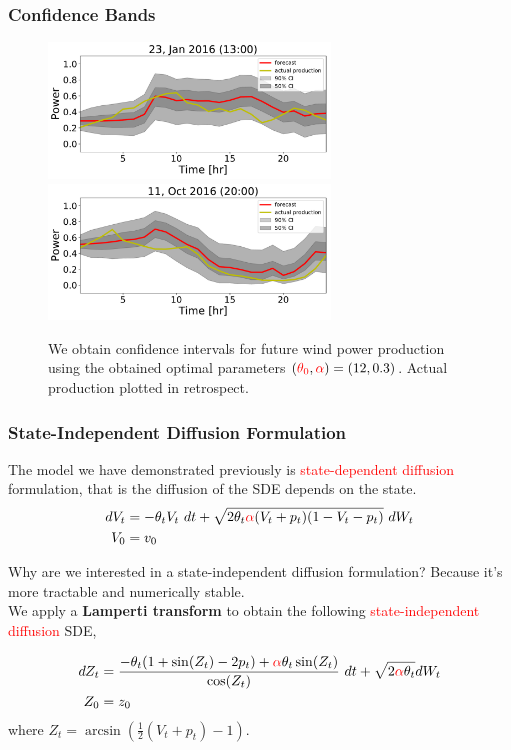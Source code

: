 \documentclass[aspectratio=169]{beamer}\usepackage[utf8]{inputenc}
\begin{document}
\begin{frame}\frametitle{Confidence Bands}
    \begin{figure}
      \includegraphics[width=75mm,scale=1]{confidence_intervals/24hr/31.pdf}
      \includegraphics[width=75mm,scale=1]{confidence_intervals/24hr/820.pdf}
       \caption{We obtain confidence intervals for future wind power production using the obtained optimal parameters $(\textcolor{red}{\theta_0}, \textcolor{red}{\alpha} )=(12,0.3)$. Actual production plotted in retrospect. }
    \end{figure}
\end{frame}

\begin{frame}\frametitle{State-Independent Diffusion Formulation}
The model we have demonstrated previously is \textcolor{red}{state-dependent diffusion} formulation, that is the diffusion of the SDE depends on the state.
\begin{equation}
\begin{split}
dV_t &=  - \theta_t V_t \  dt + \sqrt{2 \theta_t \textcolor{red}{\alpha} (V_t +p_t ) (1-V_t-p_t)} \  dW_t  \\ %
V_0 & = v_0\\
\end{split}\label{VtSDE}
\end{equation}

Why are we interested in a state-independent diffusion formulation? Because it's more tractable and numerically stable.\\
We apply a \textbf{Lamperti transform} to obtain the following \textcolor{red}{state-independent diffusion} SDE,

\begin{equation}
  \begin{split}
    dZ_t&= \frac{- \theta_t (1+ \sin(Z_t) - 2p_t) + \textcolor{red}{\alpha} \theta_t \sin (Z_t)   }{\cos (Z_t)} \ dt + \sqrt{2 \textcolor{red}{\alpha} \theta_t} dW_t \\
    Z_0&=z_0
  \end{split}
\end{equation}
where $Z_t = \arcsin \left( \frac{1}{2} \left( V_t+p_t \right) - 1 \right) $.
\end{frame}
\end{document}

